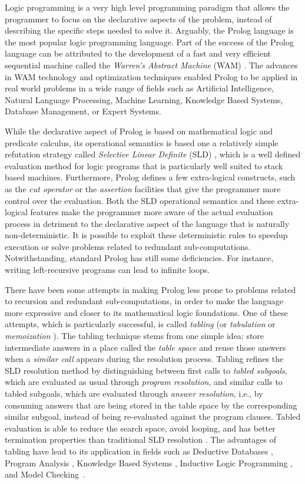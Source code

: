 Logic programming is a very high level programming paradigm that allows the programmer
to focus on the declarative aspects of the problem, instead of describing the specific steps
needed to solve it. Arguably, the Prolog language is the most popular logic
programming language. Part of the success of the Prolog language can be attributed to the
development of a fast and very efficient sequential machine called the \emph{Warren's Abstract Machine}
(WAM) \cite{Warren-83}. The advances in WAM technology and optimization techniques enabled Prolog
to be applied in real world problems in a wide range of fields such as Artificial Intelligence,
Natural Language Processing, Machine Learning, Knowledge Based Systems, Database Management, or
Expert Systems.

While the declarative aspect of Prolog is based on mathematical logic and predicate calculus,
its operational semantics is based one a relatively simple refutation strategy called \emph{Selective Linear Definite}
(SLD) \cite{Lloyd-87}, which is a well defined evaluation method for logic programs that
is particularly well suited to stack based machines.
Furthermore, Prolog defines a few extra-logical constructs, such as the \emph{cut operator}
or the \emph{assertion} facilities that give the programmer more control over the evaluation. Both the SLD operational semantics
and these extra-logical features make the programmer more aware of the actual evaluation process in detriment to the
declarative aspect of the language that is naturally non-deterministic. It is possible to exploit
these deterministic rules to speedup execution or solve
problems related to redundant sub-computations. Notwithstanding, standard Prolog has
still some deficiencies. For instance, writing left-recursive programs can lead to infinite loops.

There have been some attempts in making Prolog less prone to problems related to recursion
and redundant sub-computations, in order to make the language more expressive and closer to
its mathematical logic foundations.
One of these attempts, which is particularly successful, is called \emph{tabling}
(or \emph{tabulation} or \emph{memoization} \cite{Michie-68}). The tabling technique stems from one simple idea:
store intermediate answers in a place called the \emph{table space} and reuse those answers when a
\emph{similar call} appears during the resolution process. Tabling refines the SLD resolution method
by distinguishing between first calls to \emph{tabled subgoals}, which are evaluated as usual through
\emph{program resolution}, and similar calls to tabled subgoals, which are evaluated through \emph{answer resolution}, i.e.,
by consuming answers that are being stored in the table space by the corresponding similar subgoal, instead
of being re-evaluated against the program clauses. Tabled evaluation is able to reduce the search space,
avoid looping, and has better termination properties than traditional SLD resolution \cite{Chen-96}.
The advantages of tabling have lead to its application in fields such as Deductive Databases \cite{Sagonas-94},
Program Analysis \cite{RamakrishnanCR-00}, Knowledge Based Systems \cite{Yang-00}, Inductive Logic
Programming \cite{Rocha-05b}, and Model Checking~\cite{RamakrishnanCR-00}.

